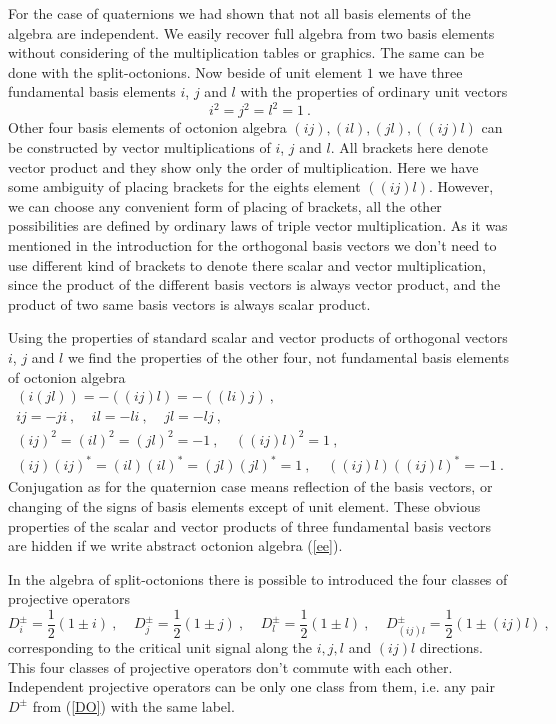 \documentclass[a4paper,12pt]{article}
\begin{document}
For the case of quaternions we had shown that not all basis elements of the algebra are 
independent. We easily recover full algebra from two basis elements without considering 
of the multiplication tables or graphics. The same can be done with the split-octonions. 
Now beside of unit element $1$ we have three fundamental basis elements $i$, $j$ and $l$ 
with the properties of ordinary unit vectors
\begin{equation} \label{i2j2l2}
i^2 = j^2 = l^2 = 1~.
\end{equation}
Other four basis elements of octonion algebra $(ij), (il), (jl), ((ij)l)$ can be 
constructed by vector multiplications of $i$, $j$ and $l$. All brackets here denote 
vector product and they show only the order of multiplication. Here we have some ambiguity 
of placing brackets for the eights element $((ij)l)$. However, we can choose any convenient 
form of placing of brackets, all the other possibilities are defined by ordinary laws of 
triple vector multiplication. As it was mentioned in the introduction for the orthogonal 
basis vectors we don't need to use different kind of brackets to denote there scalar and 
vector multiplication, since the product of the different basis vectors is always vector 
product, and the product of two same basis vectors is always scalar product. 

Using the properties of standard scalar and vector products of orthogonal vectors $i$, $j$ 
and $l$ we find the properties of the other four, not fundamental basis elements of octonion 
algebra 
\begin{eqnarray} \label{ijl}
(i(jl)) = - ((ij)l) = - ((li)j)~, \nonumber\\
ij = -ji~, ~~~~~ il = -li ~, ~~~~~ jl = -lj ~, \nonumber \\
(ij)^2 = (il)^2 = (jl)^2 = -1~, ~~~~~((ij)l)^2 = 1 ~, \\
(ij)(ij)^* = (il)(il)^* = (jl)(jl)^* = 1~, ~~~~~((ij)l)((ij)l)^* = -1 ~. \nonumber 
\end{eqnarray}
Conjugation as for the quaternion case means reflection of the basis vectors, or changing 
of the signs of basis elements except of unit element. These obvious properties of the 
scalar and vector products of three fundamental basis vectors are hidden if we write abstract 
octonion algebra (\ref{ee}).

In the algebra of split-octonions there is possible to introduced the four classes of 
projective operators 
\begin{equation} \label{DO}
D^\pm_i = \frac{1}{2}(1 \pm i) ~, ~~~~~ D^\pm_j = \frac{1}{2}(1 \pm j) ~,
~~~~~ D^\pm_l = \frac{1}{2}(1 \pm l) ~, ~~~~~ D^\pm_{(ij)l} = \frac{1}{2}(1 \pm (ij)l) ~,  
\end{equation}
corresponding to the critical unit signal along the $i,j,l$ and $(ij)l$ directions. This 
four classes of projective operators don't commute with each other. Independent projective 
operators can be only one class from them, i.e. any pair $D^\pm$ from (\ref{DO}) with the 
same label. 
\end{document}
